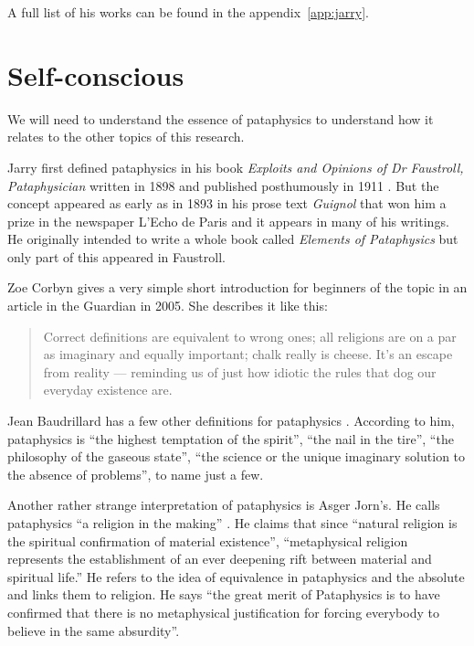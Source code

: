 A full list of his works can be found in the appendix~\ref{app:jarry}.


\section{Self-conscious}

We will need to understand the essence of pataphysics to understand how it relates to the other topics of this research.

Jarry first defined pataphysics in his book \textit{Exploits and Opinions of Dr Faustroll, Pataphysician} written in 1898 and published posthumously in 1911 \autocite{Jarry1996}. But the concept appeared as early as in 1893 in his prose text \textit{Guignol} that won him a prize in the newspaper L'Echo de Paris and it appears in many of his writings. He originally intended to write a whole book called \textit{Elements of Pataphysics} but only part of this appeared in Faustroll.

Zoe Corbyn gives a very simple short introduction for beginners of the topic in an article in the Guardian \autocite*{Corbyn2005} in 2005. She describes it like this:

\begin{quotation}
  Correct definitions are equivalent to wrong ones; all religions are on a par as imaginary and equally important; chalk really is cheese. It's an escape from reality --- reminding us of just how idiotic the rules that dog our everyday existence are. 
\end{quotation}

Jean Baudrillard has a few other definitions for pataphysics \autocite*{Baudrillard2007}. According to him, pataphysics is ``the highest temptation of the spirit'', ``the nail in the tire'', ``the philosophy of the gaseous state'', ``the science or the unique imaginary solution to the absence of problems'', to name just a few.

Another rather strange interpretation of pataphysics is Asger Jorn's. He calls pataphysics ``a religion in the making'' \autocite{Jorn1961}. He claims that since ``natural religion is the spiritual confirmation of material existence'', ``metaphysical religion represents the establishment of an ever deepening rift between material and spiritual life.'' He refers to the idea of equivalence in pataphysics and the absolute and links them to religion. He says ``the great merit of Pataphysics is to have confirmed that there is no metaphysical justification for forcing everybody to believe in the same absurdity''.

